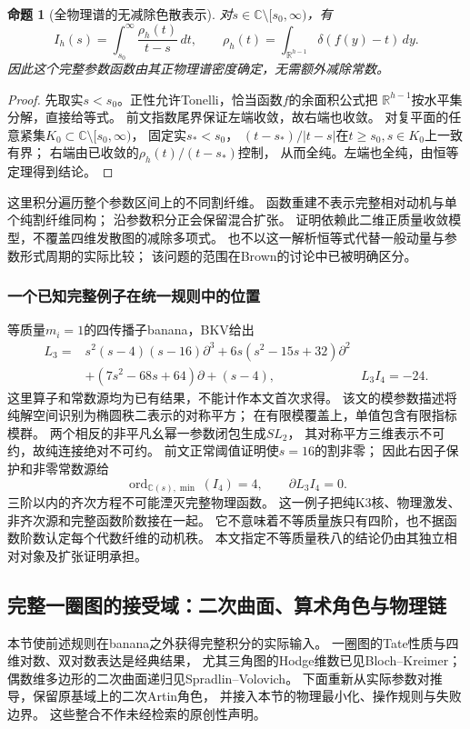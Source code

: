 \documentclass[11pt,a4paper,oneside]{ctexart}
\theoremstyle{cnplain}
\newtheorem{proposition}[theorem]{命题}
\theoremstyle{definition}
\theoremstyle{remark}
\numberwithin{equation}{section}
\begin{document}
\begin{proposition}[全物理谱的无减除色散表示]\label{unified:prop:dispersion}
对$s\in\mathbb C\setminus[s_0,\infty)$，有
\[
 I_h(s)=\int_{s_0}^{\infty}\frac{\rho_h(t)}{t-s}\,dt,
 \qquad
 \rho_h(t)=\int_{\mathbb R^{h-1}}\delta(f(y)-t)\,dy .
\]
因此这个完整参数函数由其正物理谱密度确定，无需额外减除常数。
\end{proposition}
\begin{proof}
先取实$s<s_0$。正性允许Tonelli，恰当函数$f$的余面积公式把
$\mathbb R^{h-1}$按水平集分解，直接给等式。
前文指数尾界保证左端收敛，故右端也收敛。
对复平面的任意紧集$K_0\subset\mathbb C\setminus[s_0,\infty)$，
固定实$s_*<s_0$，
$(t-s_*)/|t-s|$在$t\ge s_0,s\in K_0$上一致有界；
右端由已收敛的$\rho_h(t)/(t-s_*)$控制，
从而全纯。左端也全纯，由恒等定理得到结论。
\end{proof}
这里积分遍历整个参数区间上的不同割纤维。
函数重建不表示完整相对动机与单个纯割纤维同构；
沿参数积分正会保留混合扩张。
证明依赖此二维正质量收敛模型，不覆盖四维发散图的减除多项式。
也不以这一解析恒等式代替一般动量与参数形式周期的实际比较；
该问题的范围在Brown的讨论中已被明确区分\cite[\S10.2]{browncosmic}。

\subsubsection{一个已知完整例子在统一规则中的位置}
等质量$m_i=1$的四传播子banana，BKV给出\cite[Theorem2.2.1]{bkv}
\begin{align*}
 L_3={}&s^2(s-4)(s-16)\partial^3
       +6s(s^2-15s+32)\partial^2\\
      &+(7s^2-68s+64)\partial+(s-4),
 &L_3I_4=-24 .
\end{align*}
这里算子和常数源均为已有结果，不能计作本文首次求得。
该文的模参数描述将纯解空间识别为椭圆秩二表示的对称平方；
在有限模覆盖上，单值包含有限指标模群。
两个相反的非平凡幺幂一参数闭包生成$SL_2$，
其对称平方三维表示不可约，故纯连接绝对不可约。
前文正常阈值证明使$s=16$的割非零；
因此右因子保护和非零常数源给
\[
  \operatorname{ord}_{\mathbb C(s),\min}(I_4)=4,
  \qquad \partial L_3 I_4=0 .
\]
三阶以内的齐次方程不可能湮灭完整物理函数。
这一例子把纯K3核、物理激发、非齐次源和完整函数阶数接在一起。
它不意味着不等质量族只有四阶，也不据函数阶数认定每个代数纤维的动机秩。
本文指定不等质量秩八的结论仍由其独立相对对象及扩张证明承担。


\subsection{完整一圈图的接受域：二次曲面、算术角色与物理链}
\label{unified:sec:oneloop}
本节使前述规则在banana之外获得完整积分的实际输入。
一圈图的Tate性质与四维对数、双对数表达是经典结果，
尤其三角图的Hodge维数已见Bloch--Kreimer\cite[\S7--10]{bkone}；
偶数维多边形的二次曲面递归见Spradlin--Volovich\cite{svone}。
下面重新从实际参数对推导，保留原基域上的二次Artin角色，
并接入本节的物理最小化、操作规则与失败边界。
这些整合不作未经检索的原创性声明。
\end{document}
